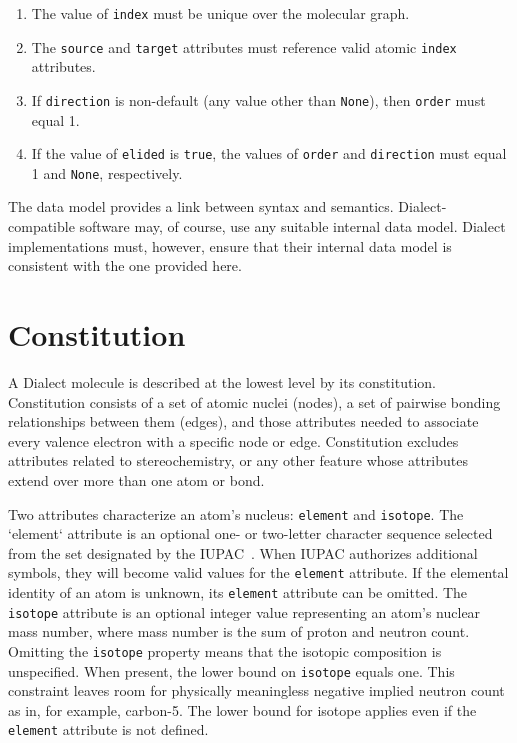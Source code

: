 \documentclass{article}
\def\ttt{\texttt}
\begin{document}
\begin{enumerate}
    \item{The value of \ttt{index} must be unique over the molecular graph.}
    \item{The \ttt{source} and \ttt{target} attributes must reference valid atomic \ttt{index} attributes.}
    \item{If \ttt{direction} is non-default (any value other than \ttt{None}), then \ttt{order} must equal 1.}
    \item{If the value of \ttt{elided} is \ttt{true}, the values of \ttt{order} and \ttt{direction} must equal 1 and \ttt{None}, respectively.}
\end{enumerate}

The data model provides a link between syntax and semantics. Dialect-compatible software may, of course, use any suitable internal data model. Dialect implementations must, however, ensure that their internal data model is consistent with the one provided here.

\section*{Constitution}

A Dialect molecule is described at the lowest level by its constitution. Constitution consists of a set of atomic nuclei (nodes), a set of pairwise bonding relationships between them (edges), and those attributes needed to associate every valence electron with a specific node or edge. Constitution excludes attributes related to stereochemistry, or any other feature whose attributes extend over more than one atom or bond.

Two attributes characterize an atom's nucleus: \ttt{element} and \ttt{isotope}. The `element` attribute is an optional one- or two-letter character sequence selected from the set designated by the IUPAC~\cite{periodicTable}. When IUPAC authorizes additional symbols, they will become valid values for the \ttt{element} attribute. If the elemental identity of an atom is unknown, its \ttt{element} attribute can be omitted. The \ttt{isotope} attribute is an optional integer value representing an atom's nuclear mass number, where mass number is the sum of proton and neutron count. Omitting the \ttt{isotope} property means that the isotopic composition is unspecified. When present, the lower bound on \ttt{isotope} equals one. This constraint leaves room for physically meaningless negative implied neutron count as in, for example, carbon-5. The lower bound for isotope applies even if the \ttt{element} attribute is not defined.
\end{document}
